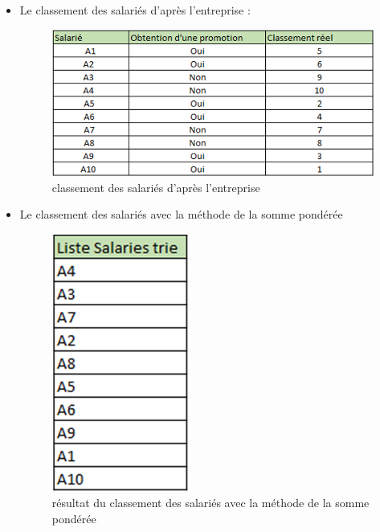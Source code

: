 \begin{itemize}
\item Le classement des salariés d’après l’entreprise :
\begin{figure}[!h]
\begin{center}
\includegraphics{Tests_resultats/classement_salarie.png}
\end{center}
\caption{classement des salariés d’après l’entreprise}
\end{figure}

\item Le classement des salariés avec la méthode de la somme pondérée
\begin{figure}[!h]
\begin{center}
\includegraphics{Tests_resultats/classement_somme_pondere.png}
\end{center}
\caption{résultat du classement des salariés avec la méthode de la somme pondérée}
\end{figure}


\end{itemize}
